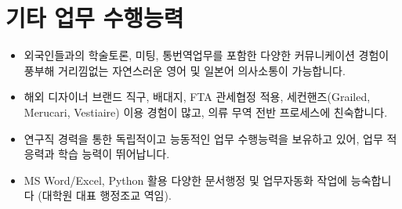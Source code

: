 \section*{기타 업무 수행능력}
\begin{itemize}
    \item 외국인들과의 학술토론, 미팅, 통번역업무를 포함한 다양한 커뮤니케이션 경험이 풍부해 거리낌없는 자연스러운 영어 및 일본어 의사소통이 가능합니다.
    \item 해외 디자이너 브랜드 직구, 배대지, FTA 관세협정 적용, 세컨핸즈(Grailed, Merucari, Vestiaire) 이용 경험이 많고, 의류 무역 전반 프로세스에 친숙합니다.
    
    \item 연구직 경력을 통한 독립적이고 능동적인 업무 수행능력을 보유하고 있어, 업무 적응력과 학습 능력이 뛰어납니다.
    \item MS Word/Excel, Python 활용 다양한 문서행정 및 업무자동화 작업에 능숙합니다 (대학원 대표 행정조교 역임).
\end{itemize}